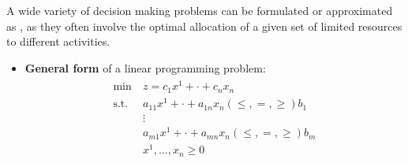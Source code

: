 \documentclass[english]{article}
\begin{document}
\bigskip
A wide variety of decision making problems can be formulated or approximated as \LP, as they often involve the optimal allocation of a given set of limited resources to different activities.

\begin{itemize}
  \item \textbf{General form} of a linear programming problem:
        \begin{gather}
          \begin{aligned}
            \min \         & z = c_1 x^1 + \cdot + c_n x_n                                    \\
            \text{s.t.} \  & a_{11} x^1 + \cdot + a_{1n} x_n \left( \leq, =, \geq \right) b_1 \\
                           & \vdots                                                           \\
                           & a_{m1} x^1 + \cdot + a_{mn} x_n \left( \leq, =, \geq \right) b_m \\
                           & x^1, \ldots, x_n \geq 0
          \end{aligned}
        \end{gather}


\end{itemize}
\end{document}
